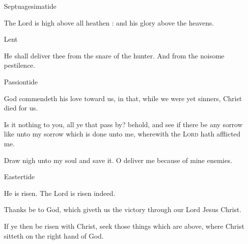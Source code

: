 \begin{multicols}{2}
\centerline{\color{RubricRed}\small%
Septuagesimatide}
\par\noindent
The Lord is high above all heathen : and his glory above the heavens.\\

\centerline{\color{RubricRed}\small%
Lent}
\par\noindent
    He shall deliver thee from the snare of the hunter. And from the noisome pestilence.\\
    
\centerline{\color{RubricRed}\small%
Passiontide}
\par\noindent
    God commendeth his love toward us, in that, while we were yet sinners, Christ died for us.\par
    Is it nothing to you, all ye that pass by? behold, and see if there be any sorrow like unto my sorrow which is done unto me, wherewith the \textsc{Lord} hath afflicted me.\par
Draw nigh unto my soul and save it. O deliver me because of mine enemies.\\

\centerline{\color{RubricRed}\small%
Eastertide}
\par\noindent
    He is risen. The Lord is risen indeed.\par
    Thanks be to God, which giveth us the victory through our Lord Jesus Christ.\par
    If ye then be risen with Christ, seek those things which are above, where Christ sitteth on the right hand of God.\\


\end{multicols}
